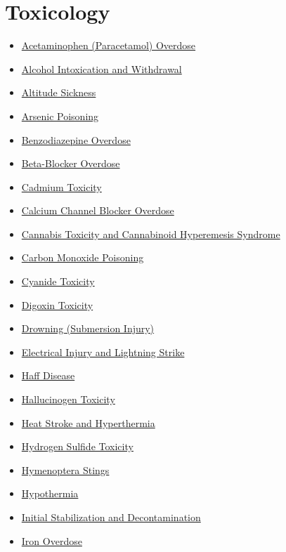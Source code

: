\section*{Toxicology}
\label{sec:organ_toxicology}
\begin{itemize}[noitemsep]
  \item \hyperlink{sec:Acetaminophen Overdose}{Acetaminophen (Paracetamol) Overdose}
  \item \hyperlink{sec:Alcohol Intoxication and Withdrawal}{Alcohol Intoxication and Withdrawal}
  \item \hyperlink{sec:Altitude Sickness}{Altitude Sickness}
  \item \hyperlink{sec:Arsenic Poisoning}{Arsenic Poisoning}
  \item \hyperlink{sec:Benzodiazepine Overdose}{Benzodiazepine Overdose}
  \item \hyperlink{sec:Beta-Blocker Overdose}{Beta-Blocker Overdose}
  \item \hyperlink{sec:Cadmium Toxicity}{Cadmium Toxicity}
  \item \hyperlink{sec:CCB Overdose}{Calcium Channel Blocker Overdose}
  \item \hyperlink{sec:Cannabis Toxicity}{Cannabis Toxicity and Cannabinoid Hyperemesis Syndrome}
  \item \hyperlink{sec:Carbon Monoxide Poisoning}{Carbon Monoxide Poisoning}
  \item \hyperlink{sec:Cyanide Toxicity}{Cyanide Toxicity}
  \item \hyperlink{sec:Digoxin Toxicity}{Digoxin Toxicity}
  \item \hyperlink{sec:Drowning}{Drowning (Submersion Injury)}
  \item \hyperlink{sec:Electrical Injury}{Electrical Injury and Lightning Strike}
  \item \hyperlink{sec:Haff Disease}{Haff Disease}
  \item \hyperlink{sec:Hallucinogen Toxicity}{Hallucinogen Toxicity}
  \item \hyperlink{sec:Heat Stroke}{Heat Stroke and Hyperthermia}
  \item \hyperlink{sec:Hydrogen Sulfide Toxicity}{Hydrogen Sulfide Toxicity}
  \item \hyperlink{sec:Hymenoptera Stings}{Hymenoptera Stings}
  \item \hyperlink{sec:Hypothermia}{Hypothermia}
  \item \hyperlink{sec:Initial Stabilization}{Initial Stabilization and Decontamination}
  \item \hyperlink{sec:Iron Overdose}{Iron Overdose}

\end{itemize}
